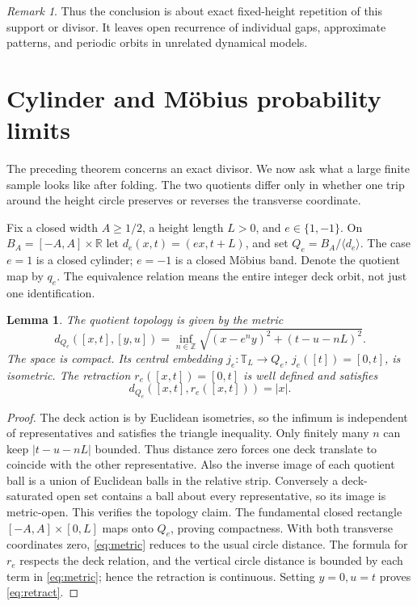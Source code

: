 \documentclass[11pt,a4paper]{article}
\newtheorem{lemma}[theorem]{Lemma}
\theoremstyle{definition}
\theoremstyle{remark}
\newtheorem{remark}[theorem]{Remark}
\newcommand{\R}{\mathbb R}
\newcommand{\Z}{\mathbb Z}
\newcommand{\T}{\mathbb T}
\begin{document}
\begin{remark}
Thus the conclusion is about exact fixed-height repetition of this support
or divisor. It leaves open recurrence of individual gaps, approximate
patterns, and periodic orbits in unrelated dynamical models.
\end{remark}

\section{Cylinder and M\"obius probability limits}\label{sec:quotient}

The preceding theorem concerns an exact divisor. We now ask what a large
finite sample looks like after folding. The two quotients differ only in
whether one trip around the height circle preserves or reverses the
transverse coordinate.

Fix a closed width $A\ge1/2$, a height length $L>0$, and $e\in\{1,-1\}$.
On $B_A=[-A,A]\times\R$ let $d_e(x,t)=(ex,t+L)$, and set
$Q_e=B_A/\langle d_e\rangle$. The case $e=1$ is a closed cylinder;
$e=-1$ is a closed M\"obius band. Denote the quotient map by $q_e$.
The equivalence relation means the entire integer deck orbit, not just
one identification.

\begin{lemma}\label{lem:metric}
The quotient topology is given by the metric
\begin{equation}\label{eq:metric}
 d_{Q_e}([x,t],[y,u])=
 \inf_{n\in\Z}\sqrt{(x-e^ny)^2+(t-u-nL)^2}.
\end{equation}
The space is compact. Its central embedding $j_e:\T_L\to Q_e$,
$j_e([t])=[0,t]$, is isometric. The retraction
$r_e([x,t])=[0,t]$ is well defined and satisfies
\begin{equation}\label{eq:retract}
 d_{Q_e}([x,t],r_e([x,t]))=|x|.
\end{equation}
\end{lemma}
\begin{proof}
The deck action is by Euclidean isometries, so the infimum is independent
of representatives and satisfies the triangle inequality. Only finitely
many $n$ can keep $|t-u-nL|$ bounded. Thus distance zero forces one deck
translate to coincide with the other representative. Also the inverse image
of each quotient ball is a union of Euclidean balls in the relative strip.
Conversely a deck-saturated open set contains a ball about every representative,
so its image is metric-open. This verifies the topology claim.
The fundamental closed rectangle $[-A,A]\times[0,L]$ maps onto $Q_e$,
proving compactness. With both transverse coordinates zero,
\eqref{eq:metric} reduces to the usual circle distance. The formula for $r_e$
respects the deck relation, and the vertical circle distance is bounded by
each term in \eqref{eq:metric}; hence the retraction is continuous. Setting
$y=0,u=t$ proves \eqref{eq:retract}.
\end{proof}
\end{document}
